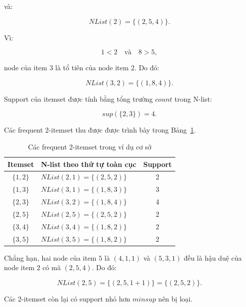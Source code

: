 và:

\begin{equation}
    NList(2)=\{(2,5,4)\}.
\end{equation}

Vì:

\begin{equation}
    1<2
    \quad\text{và}\quad
    8>5,
\end{equation}

node của item $3$ là tổ tiên của node item $2$. Do đó:

\begin{equation}
    NList(3,2)=\{(1,8,4)\}.
    \label{eq:basic-nlist-32}
\end{equation}

Support của itemset được tính bằng tổng trường $count$ trong N-list:

\begin{equation}
    sup(\{2,3\})=4.
    \label{eq:basic-support-23}
\end{equation}

Các frequent 2-itemset thu được được trình bày trong Bảng~\ref{tab:basic-frequent-2-itemsets}.

\begin{table}[H]
\centering
\caption{Các frequent 2-itemset trong ví dụ cơ sở}
\label{tab:basic-frequent-2-itemsets}
\begin{tabular}{clc}
\toprule
Itemset & N-list theo thứ tự toàn cục & Support \\
\midrule
$\{1,2\}$ & $NList(2,1)=\{(2,5,2)\}$ & 2 \\
$\{1,3\}$ & $NList(3,1)=\{(1,8,3)\}$ & 3 \\
$\{2,3\}$ & $NList(3,2)=\{(1,8,4)\}$ & 4 \\
$\{2,5\}$ & $NList(2,5)=\{(2,5,2)\}$ & 2 \\
$\{3,4\}$ & $NList(3,4)=\{(1,8,2)\}$ & 2 \\
$\{3,5\}$ & $NList(3,5)=\{(1,8,2)\}$ & 2 \\
\bottomrule
\end{tabular}
\end{table}

Chẳng hạn, hai node của item $5$ là $(4,1,1)$ và $(5,3,1)$ đều là hậu duệ của node item $2$ có mã $(2,5,4)$. Do đó:

\begin{equation}
    NList(2,5)
    =
    \{(2,5,1+1)\}
    =
    \{(2,5,2)\}.
\end{equation}

Các 2-itemset còn lại có support nhỏ hơn $\mathit{minsup}$ nên bị loại.

